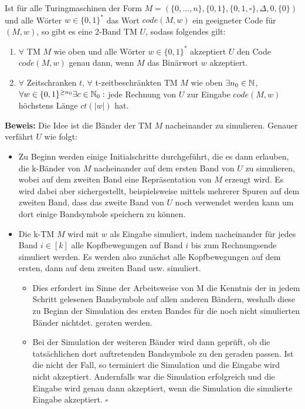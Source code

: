 
\begin{satz}{}
    Ist für alle Turingmaschinen der Form $M = (\{0, ..., n\}, \{0, 1\}, \{0, 1, \square\}, \Delta, 0, \{0\})$ und alle Wörter $w \in \{0, 1\}^*$ das Wort $code(M, w)$ ein geeigneter Code für $(M, w)$, so gibt es eine 2-Band TM $U$, sodass folgendes gilt:
    \begin{enumerate}[label=(\roman*)]
        \item $\forall$ TM $M$ wie oben und alle Wörter $w \in \{0, 1\}^*$ akzeptiert $U$ den Code $code(M, w)$ genau dann, wenn $M$ das Binärwort $w$ akzeptiert.
        \item $\forall$ Zeitschranken $t$, $\forall$ t-zeitbeschränkten TM $M$ wie oben $\exists n_0 \in \mathbb{N}$, $\forall w \in \{0, 1\}^{\geq n_0} \exists c \in \mathbb{N}_0 :$ jede Rechnung von $U$ zur Eingabe $code(M, w)$ höchstens Länge $ct(|w|)$ hat.
    \end{enumerate}
    
    \textbf{Beweis:} Die Idee ist die Bänder der TM $M$ nacheinander zu simulieren. Genauer verfährt $U$ wie folgt:
    \begin{itemize}
        \item Zu Beginn werden einige Initialschritte durchgeführt, die es dann erlauben, die k-Bänder von $M$ nacheinander auf dem ersten Band von $U$ zu simulieren, wobei auf dem zweiten Band eine Repräsentation von $M$ erzeugt wird. Es wird dabei aber sichergestellt, beispielsweise mittels mehrerer Spuren auf dem zweiten Band, dass das zweite Band von $U$ noch verwendet werden kann um dort einige Bandsymbole speichern zu können.
        \item Die k-TM $M$ wird mit $w$ als Eingabe simuliert, indem nacheinander für jedes Band $i \in [k]$ alle Kopfbewegungen auf Band $i$ bis zum Rechnungsende simuliert werden. Es werden also zunächst alle Kopfbewegungen auf dem ersten, dann auf dem zweiten Band usw. simuliert.
        \begin{itemize}
            \item Dies erfordert im Sinne der Arbeitsweise von M die Kenntnis der in jedem Schritt gelesenen Bandsymbole auf allen anderen Bändern, weshalb diese zu Beginn der Simulation des ersten Bandes für die noch nicht simulierten Bänder nichtdet. geraten werden.
            \item Bei der Simulation der weiteren Bänder wird dann geprüft, ob die tatsächlichen dort auftretenden Bandsymbole zu den geraden passen. Ist die nicht der Fall, so terminiert die Simulation und die Eingabe wird nicht akzeptiert. Andernfalls war die Simulation erfolgreich und die Eingabe wird genau dann akzeptiert, wenn die Simulation die simulierte Eingabe akzeptiert. \hspace*{\fill}$\square$
        \end{itemize}
    \end{itemize}
\end{satz}

